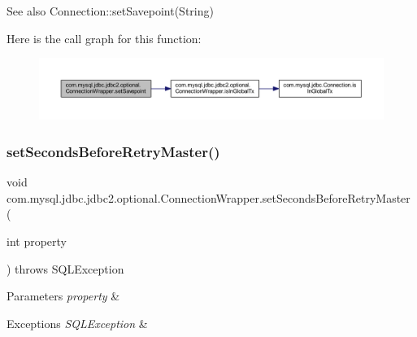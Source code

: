 \begin{DoxySeeAlso}{See also}
Connection\+::set\+Savepoint(\+String) 
\end{DoxySeeAlso}
Here is the call graph for this function\+:
\nopagebreak
\begin{figure}[H]
\begin{center}
\leavevmode
\includegraphics[width=350pt]{classcom_1_1mysql_1_1jdbc_1_1jdbc2_1_1optional_1_1_connection_wrapper_ad8a366e0948f61c404409d7afdb45b31_cgraph}
\end{center}
\end{figure}
\mbox{\label{classcom_1_1mysql_1_1jdbc_1_1jdbc2_1_1optional_1_1_connection_wrapper_af7f390ffe3cd2dea5f5192e52147be89}} 
\subsubsection{\texorpdfstring{set\+Seconds\+Before\+Retry\+Master()}{setSecondsBeforeRetryMaster()}}
{\footnotesize\ttfamily void com.\+mysql.\+jdbc.\+jdbc2.\+optional.\+Connection\+Wrapper.\+set\+Seconds\+Before\+Retry\+Master (\begin{DoxyParamCaption}\item[{int}]{property }\end{DoxyParamCaption}) throws S\+Q\+L\+Exception}


\begin{DoxyParams}{Parameters}
{\em property} & \\
\hline
\end{DoxyParams}

\begin{DoxyExceptions}{Exceptions}
{\em S\+Q\+L\+Exception} & \\
\hline
\end{DoxyExceptions}


